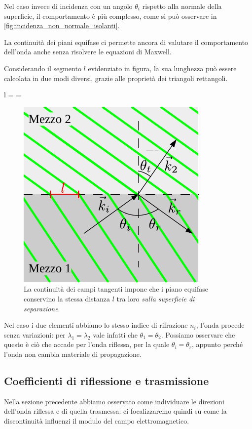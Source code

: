 	Nel caso invece di incidenza con un angolo $\theta_i$ rispetto alla normale della superficie, il comportamento è più complesso, come si può osservare in \autoref{fig:incidenza_non_normale_isolanti}.

	La continuità dei piani equifase ci permette ancora di valutare il comportamento dell'onda anche senza risolvere le equazioni di Maxwell.

	Considerando il segmento $l$ evidenziato in figura, la sua lunghezza può essere calcolata in due modi diversi, grazie alle proprietà dei triangoli rettangoli.

	\begin{esp} \label{eq:legge_di_snell}
		l =  = 
	\end{esp}

	\begin{figure}[ht]
		\centering
		\includegraphics{img/incidenza_non_normale.pdf}
		\caption{La continuità dei campi tangenti impone che i piano equifase conservino la stessa distanza $l$ tra loro \emph{sulla superficie di separazione}.}
		\label{fig:incidenza_non_normale_isolanti}
	\end{figure}

	Nel caso i due elementi abbiamo lo stesso indice di rifrazione $n_i$, l'onda procede senza variazioni: per $\lambda_1 = \lambda_2$ vale infatti che $\theta_1 = \theta_2$.
	Possiamo osservare che questo è ciò che accade per l'onda riflessa, per la quale $\theta_i = \theta_r$, appunto perché l'onda non cambia materiale di propagazione.

\subsection{Coefficienti di riflessione e trasmissione}
	Nella sezione precedente abbiamo osservato come individuare le direzioni dell'onda riflessa e di quella trasmessa: ci focalizzaremo quindi su come la discontinuità influenzi il modulo del campo elettromagnetico.

